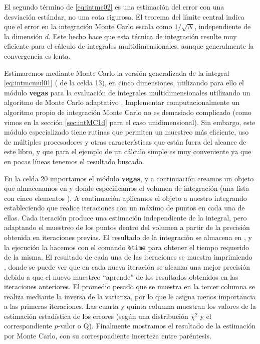El segundo término de \eqref{eq:intmc02} es una estimación del error con una desviación estándar, no una cota rigurosa. El teorema del límite central indica que el error en la integración Monte Carlo escala como $1/\sqrt{N}$, independiente de la dimensión $d$. Este hecho hace que esta técnica de integración resulte muy eficiente para el cálculo de integrales multidimensionales, aunque generalmente la convergencia es lenta.

Estimaremos mediante Monte Carlo la versión generalizada de la integral \eqref{eq:intmcmul01} ( de la celda 13), en cinco dimensiones, utilizando para ello el módulo \textbf{vegas} para la evaluación de integrales multidimensionales utilizando un algoritmo de Monte Carlo adaptativo \cite{lepage1978,lepage2021}. Implementar computacionalmente un algoritmo propio de integración Monte Carlo no es demasiado complicado (como vimos en la sección \ref{sec:intMC1d} para el caso unidimensional). Sin embargo, este módulo especializado tiene rutinas que permiten un muestreo más eficiente, uso de múltiples procesadores y otras características que están fuera del alcance de este libro, y que para el ejemplo de un cálculo simple es muy conveniente ya que en pocas líneas tenemos el resultado buscado.

En la celda 20 importamos el módulo \textbf{vegas}, y a continuación creamos un objeto  que almacenamos en  y donde especificamos el volumen de integración (una lista con cinco elementos \mip{[-1, 1]}). A continuación aplicamos el objeto  a nuestro integrando estableciendo que realice  iteraciones con un máximo de  puntos en cada una de ellas. Cada iteración produce una estimación independiente de la integral, pero adaptando el muestreo de los puntos dentro del volumen a partir de la precisión obtenida en iteraciones previas. El resultado de la integración se almacena en , y la ejecución la hacemos con el comando \verb|%time| para obtener el tiempo requerido de la misma. El resultado de cada una de las iteraciones se muestra imprimiendo , donde se puede ver que en cada nueva iteración se alcanza una mejor precisión debido a que el nuevo muestreo ``aprende'' de los resultados obtenidos en las iteraciones anteriores. El promedio pesado que se muestra en la tercer columna se realiza mediante la inversa de la varianza, por lo que le asigna menos importancia a las primeras iteraciones. Las cuarta y quinta columna muestran los valores de la estimación estadística de los errores (según una distribución $\chi^2$ y el correspondiente $p$-valor o Q). Finalmente mostramos el resultado de la estimación por Monte Carlo, con su correspondiente incerteza entre paréntesis.

